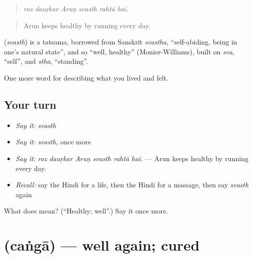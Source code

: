 \begin{quote}
     
\end{quote}

\begin{quote}
\emph{roz dauṛkar Aruṇ svasth rahtā hai.}
\end{quote}

\begin{quote}
Arun keeps healthy by running every day.
\end{quote}

\begin{cousinweb}
\textbf{} (\emph{svasth}) is a tatsama, borrowed from Sanskrit \emph{svastha}, \textquotedblleft{}self-abiding, being in one's natural state\textquotedblright{}, and so \textquotedblleft{}well, healthy\textquotedblright{} (Monier-Williams), built on \emph{sva}, \textquotedblleft{}self\textquotedblright{}, and \emph{stha}, \textquotedblleft{}standing\textquotedblright{}.
\end{cousinweb}

\begin{grammarlens}[title={What you've built}]
One more word for describing what you lived and felt.
\end{grammarlens}

\subsection*{Your turn}
\begin{itemize}
\raggedright
  \item \emph{Say it:} \emph{svasth}
  \item \emph{Say it:} \emph{svasth}, once more
  \item \emph{Say it:} \emph{roz dauṛkar Aruṇ svasth rahtā hai.} — Arun keeps healthy by running every day.
  \item \emph{Recall:} say the Hindi for a life, then the Hindi for a massage, then say \emph{svasth} again
\end{itemize}

\begin{tcolorbox}[breakable,colback=teal!4,colframe=teal!35!black,title={Before you move on}]
What does  mean? (\textquotedblleft{}Healthy; well\textquotedblright{}.) Say it once more.
\end{tcolorbox}
\section[\texorpdfstring{\hi{चंगा} (caṅgā)}{चंगा (caṅgā)}]{ (caṅgā) — well again; cured}

